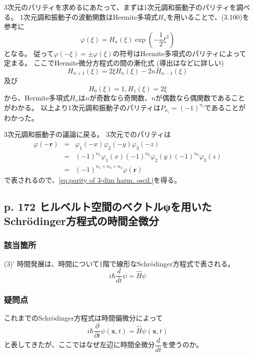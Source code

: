\documentclass{jsarticle}
\begin{document}
3次元のパリティを求めるにあたって、まずは1次元調和振動子のパリティを調べる。
1次元調和振動子の波動関数はHermite多項式$H_n$を用いることで、(3.100)を参考に
\begin{equation*}
    \varphi(\xi)
    =
    H_n(\xi)\exp\left(-\dfrac{1}{2}\xi^2\right)
\end{equation*}
となる。
従って$\varphi(-\xi)=\pm\varphi(\xi)$の符号はHermite多項式のパリティによって定まる。
ここでHermite微分方程式の間の漸化式 (導出は\cite{recurrence of Hermite}などに詳しい)
\begin{equation*}
    H_{n+1}(\xi)
    =
    2\xi H_n(\xi)
    -
    2nH_{n-1}(\xi)
\end{equation*}
及び
\begin{equation*}
    H_0(\xi)=1, H_1(\xi)=2\xi
\end{equation*}
から、Hermite多項式$H_n$は$n$が奇数なら奇関数、$n$が偶数なら偶関数であることがわかる。
以上より1次元調和振動子のパリティは$P_{n_i}=(-1)^{n_i}$であることがわかった。

3次元調和振動子の議論に戻る。
3次元でのパリティは
\begin{equation*}
    \begin{array}{rcl}
        \varphi(-\bm{r})
        &=&
        \varphi_1(-x)\varphi_2(-y)\varphi_3(-z)
        \\
        &=&
        (-1)^{n_1}\varphi_1(x)(-1)^{n_2}\varphi_2(y)(-1)^{n_3}\varphi_3(z)
        \\
        &=&
        (-1)^{n_1+n_2+n_3}\varphi(\bm{r})
    \end{array}
\end{equation*}
で表されるので、\eqref{eq:parity of 3-dim harm. oscil.}を得る。


\subsection*{p. 172 ヒルベルト空間のベクトルψを用いたSchrödinger方程式の時間全微分}

\subsubsection*{該当箇所}
(3)' 時間発展は、時間について1階で線形なSchrödinger方程式で表される。
\begin{equation*}
    \tag{6.4}
    i\hbar\dfrac{d}{dt}\psi=\hat{H}\psi
\end{equation*}

\subsubsection*{疑問点}
これまでのSchrödinger方程式は時間偏微分によって
\begin{equation*}
    i\hbar\dfrac{\partial}{\partial t}\psi(\bm{x},t)
    =
    \hat{H}\psi(\bm{x},t)
\end{equation*}
と表してきたが、ここではなぜ左辺に時間全微分$\displaystyle\dfrac{d}{dt}$を使うのか。
\end{document}
